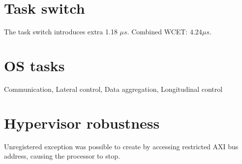 \section{Task switch}
The task switch introduces extra 1.18 $\mu s$. Combined WCET: $4.24 \mu s$.

\section{OS tasks}
Communication, Lateral control, Data aggregation, Longitudinal control

\section{Hypervisor robustness}
Unregistered exception was possible to create by accessing restricted AXI bus address, causing the processor to stop.
